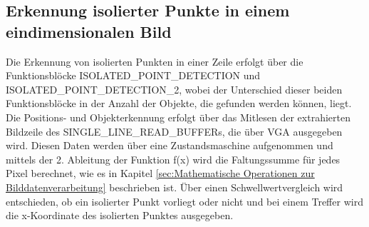 \documentclass[ngerman,12pt]{article} %
\begin{document}
{\subsection{Erkennung isolierter Punkte in einem eindimensionalen Bild}
\label{sec:Erkennung isolierter Punkte in einem eindimensionalen Bild}
Die Erkennung von isolierten Punkten in einer Zeile erfolgt über die Funktionsblöcke ISOLATED\_POINT\_DETECTION und ISOLATED\_POINT\_DETECTION\_2, wobei der Unterschied dieser beiden Funktionsblöcke in der Anzahl der Objekte, die gefunden werden können, liegt. Die Positions- und Objekterkennung erfolgt über das Mitlesen der extrahierten Bildzeile des SINGLE\_LINE\_READ\_BUFFERs, die über VGA ausgegeben wird. Diesen Daten werden über eine Zustandsmaschine aufgenommen und mittels der 2. Ableitung der Funktion f(x) wird die Faltungssumme für jedes Pixel berechnet, wie es in Kapitel \ref{sec:Mathematische Operationen zur Bilddatenverarbeitung} beschrieben ist. Über einen Schwellwertvergleich wird entschieden, ob ein isolierter Punkt vorliegt oder nicht und bei einem Treffer wird die x-Koordinate des isolierten Punktes ausgegeben.\newline

}
\end{document}
